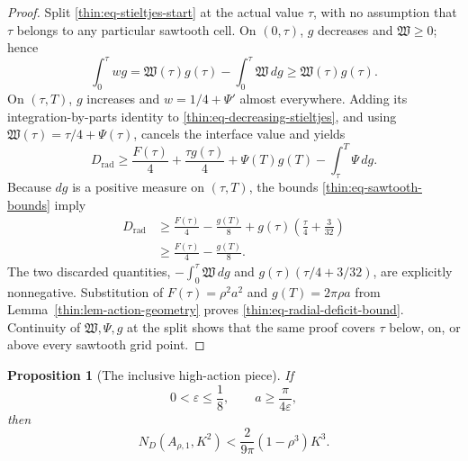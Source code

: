 \documentclass[11pt]{article}
\numberwithin{equation}{section}
\newtheorem{proposition}[theorem]{Proposition}
\theoremstyle{definition}
\theoremstyle{remark}
\begin{document}
\begin{proof}
Split \eqref{thin:eq-stieltjes-start} at the actual value \(\tau\), with
no assumption that \(\tau\) belongs to any particular sawtooth cell.  On
\((0,\tau)\), \(g\) decreases and \(\mathfrak W\geq0\); hence
\begin{equation}
  \int_0^\tau wg
  =\mathfrak W(\tau)g(\tau)-\int_0^\tau \mathfrak W\,dg
  \geq \mathfrak W(\tau)g(\tau).
  \label{thin:eq-decreasing-stieltjes}
\end{equation}
On \((\tau,T)\), \(g\) increases and \(w=1/4+\Psi'\) almost everywhere.
Adding its integration-by-parts identity to
\eqref{thin:eq-decreasing-stieltjes}, and using
\(\mathfrak W(\tau)=\tau/4+\Psi(\tau)\), cancels the interface value and
yields
\[
  D_{\mathrm{rad}}
  \geq \frac{F(\tau)}4+\frac{\tau g(\tau)}4
     +\Psi(T)g(T)-\int_\tau^T\Psi\,dg.
\]
Because \(dg\) is a positive measure on \((\tau,T)\), the bounds
\eqref{thin:eq-sawtooth-bounds} imply
\[
\begin{aligned}
  D_{\mathrm{rad}}
  &\geq \frac{F(\tau)}4-\frac{g(T)}8
    +g(\tau)\left(\frac\tau4+\frac3{32}\right) \\
  &\geq \frac{F(\tau)}4-\frac{g(T)}8.
\end{aligned}
\]
The two discarded quantities,
\(-\int_0^\tau \mathfrak W\,dg\) and
\(g(\tau)(\tau/4+3/32)\), are explicitly nonnegative.  Substitution of
\(F(\tau)=\rho^2a^2\) and \(g(T)=2\pi\rho a\) from
Lemma~\ref{thin:lem-action-geometry} proves
\eqref{thin:eq-radial-deficit-bound}.  Continuity of
\(\mathfrak W,\Psi,g\) at the
split shows that the same proof covers \(\tau\) below, on, or above every
sawtooth grid point.
\end{proof}

\begin{proposition}[The inclusive high-action piece]
\label{thin:prop-high-piece}
If
\[
  0<\varepsilon\leq\frac18,
  \qquad a\geq\frac{\pi}{4\varepsilon},
\]
then
\begin{equation}
  N_D(A_{\rho,1},K^2)
  <\frac{2}{9\pi}(1-\rho^3)K^3.
  \label{thin:eq-high-piece-conclusion}
\end{equation}
\end{proposition}
\end{document}
